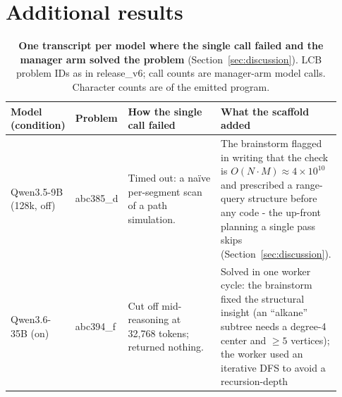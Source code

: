 \documentclass{article}
\begin{document}


\section{Additional results}
\label{app:results}







\begin{table}[p]
\centering
\caption{\textbf{One transcript per model where the single call failed and the manager arm solved
the problem} (Section~\ref{sec:discussion}). LCB problem IDs as in release\_v6; call counts are
manager-arm model calls. Character counts are of the emitted program.}
\label{tab:transcripts}
\footnotesize
\setlength{\tabcolsep}{4pt}
\setlength{\defaultaddspace}{2.5pt}
\begin{tabular}{@{}p{0.155\linewidth}p{0.101\linewidth}p{0.310\linewidth}p{0.364\linewidth}@{}}
\toprule
\textbf{Model} \newline \textbf{(condition)} & \textbf{Problem} & \textbf{How the single call failed} &
\textbf{What the scaffold added} \\
\midrule
Qwen3.5-9B \newline (128k, off) & abc385\_d & Timed out: a na\"ive per-segment scan of a path
simulation. & The brainstorm flagged in writing that the check is $O(N\cdot M) \approx
4\times10^{10}$ and prescribed a range-query structure before any code - the up-front
planning a single pass skips (Section~\ref{sec:discussion}). \\
\addlinespace
Qwen3.6-35B \newline (on) & abc394\_f & Cut off mid-reasoning at 32,768 tokens; returned nothing. &
Solved in one worker cycle: the brainstorm fixed the structural insight (an ``alkane'' subtree needs
a degree-4 center and $\ge 5$ vertices); the worker used an iterative DFS to avoid a recursion-depth

\end{tabular}
\end{table}
\end{document}
